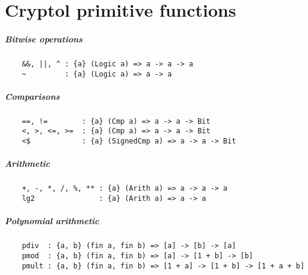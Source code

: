 \chapter{Cryptol primitive functions}


\paragraph*{Bitwise operations}
\begin{Verbatim}
    &&, ||, ^ : {a} (Logic a) => a -> a -> a
    ~         : {a} (Logic a) => a -> a
\end{Verbatim}
\paragraph*{Comparisons}
\begin{Verbatim}
    ==, !=        : {a} (Cmp a) => a -> a -> Bit
    <, >, <=, >=  : {a} (Cmp a) => a -> a -> Bit
    <$            : {a} (SignedCmp a) => a -> a -> Bit
\end{Verbatim}
\paragraph*{Arithmetic}
\begin{Verbatim}
    +, -, *, /, %, ** : {a} (Arith a) => a -> a -> a
    lg2               : {a} (Arith a) => a -> a
\end{Verbatim}
\paragraph*{Polynomial arithmetic}
\begin{Verbatim}
    pdiv  : {a, b} (fin a, fin b) => [a] -> [b] -> [a]
    pmod  : {a, b} (fin a, fin b) => [a] -> [1 + b] -> [b]
    pmult : {a, b} (fin a, fin b) => [1 + a] -> [1 + b] -> [1 + a + b]
\end{Verbatim}
